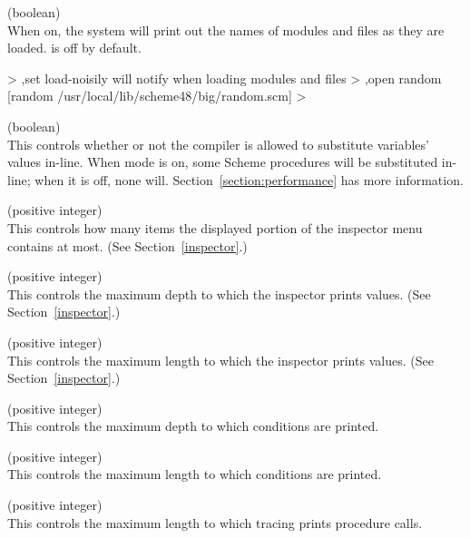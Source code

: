 \begin{description}
\item {} (boolean)\\
    When on, the system will print out the names of modules and files
    as they are loaded.   is off by default.
\begin{example}
> ,set load-noisily
will notify when loading modules and files
> ,open random
[random /usr/local/lib/scheme48/big/random.scm]
> 
\end{example}

\item {} (boolean)\\
This controls whether or not the compiler is allowed to substitute
 variables' values in-line.
When  mode is on,
some Scheme procedures will be substituted in-line; when it is off,
none will.
Section~\ref{section:performance}
has more information.

\item {} (positive integer)\\
This controls how many items the displayed portion of the inspector
menu contains at most.  (See Section~\ref{inspector}.)

\item {} (positive integer)\\
This controls the maximum depth to which the inspector
prints values.  (See Section~\ref{inspector}.)

\item {} (positive integer)\\
This controls the maximum length to which the inspector
prints values.  (See Section~\ref{inspector}.)

\item {} (positive integer)\\
This controls the maximum depth to which conditions
are printed.

\item {} (positive integer)\\
This controls the maximum length to which conditions
are printed.

\item {} (positive integer)\\
This controls the maximum length to which tracing
prints procedure calls.
\end{description}

